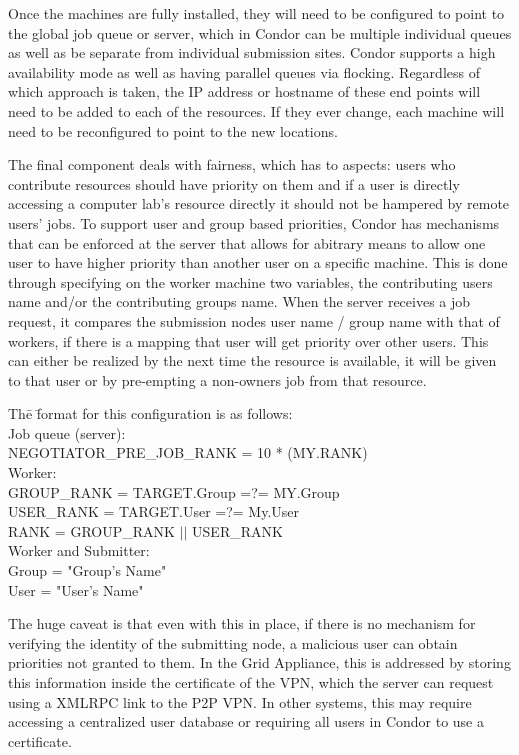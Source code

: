 \documentclass[conference]{IEEEtran}
\begin{document}
Once the machines are fully installed, they will need to be configured to point
to the global job queue or server, which in Condor can be multiple individual
queues as well as be separate from individual submission sites.  Condor
supports a high availability mode as well as having parallel queues via
flocking.  Regardless of which approach is taken, the IP address or hostname of
these end points will need to be added to each of the resources.  If they ever
change, each machine will need to be reconfigured to point to the new
locations.

The final component deals with fairness, which has to aspects:  users who
contribute resources should have priority on them and if a user is directly
accessing a computer lab's resource directly it should not be hampered by
remote users' jobs.  To support user and group based priorities, Condor has
mechanisms that can be enforced at the server that allows for abitrary means to
allow one user to have higher priority than another user on a specific machine.
This is done through specifying on the worker machine two variables, the
contributing users name and/or the contributing groups name.  When the server
receives a job request, it compares the submission nodes user name / group name
with that of workers, if there is a mapping that user will get priority over
other users.  This can either be realized by the next time the resource is
available, it will be given to that user or by pre-empting a non-owners job
from that resource.

\begin{tabbing}
Th\=e \=format for this configuration is as follows:\\
\> Job queue (server):\\
\> \> NEGOTIATOR\_PRE\_JOB\_RANK = 10 * (MY.RANK) \\
\> Worker:\\
\> \> GROUP\_RANK = TARGET.Group =?= MY.Group \\
\> \> USER\_RANK = TARGET.User =?= My.User \\
\> \> RANK = GROUP\_RANK $\vert\vert$ USER\_RANK \\
\>  Worker and Submitter:\\
\> \> Group = "Group's Name"\\
\> \> User = "User's Name"
\end{tabbing}

The huge caveat is that even with this in place, if there is no mechanism for
verifying the identity of the submitting node, a malicious user can obtain
priorities not granted to them.  In the Grid Appliance, this is addressed by
storing this information inside the certificate of the VPN, which the server
can request using a XMLRPC link to the P2P VPN.  In other systems, this may
require accessing a centralized user database or requiring all users in Condor
to use a certificate.
\end{document}
